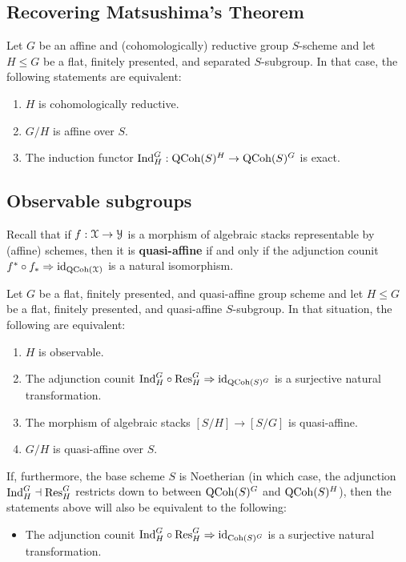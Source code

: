     \subsection{Recovering Matsushima's Theorem}
        \begin{proposition}
            Let $G$ be an affine and (cohomologically) reductive group $S$-scheme and let $H \leq G$ be a flat, finitely presented, and separated $S$-subgroup. In that case, the following statements are equivalent:
            \begin{enumerate}
                \item $H$ is cohomologically reductive.
                \item $G/H$ is affine over $S$.
                \item The induction functor $\mathrm{Ind}_H^G: \mathrm{QCoh}(S)^H \to \mathrm{QCoh}(S)^G$ is exact. 
            \end{enumerate}
        \end{proposition}

    \subsection{Observable subgroups}
        Recall that if $f: \mathcal{X} \to \mathcal{Y}$ is a morphism of algebraic stacks representable by (affine) schemes, then it is \textbf{quasi-affine} if and only if the adjunction counit $f^* \circ f_* \Rightarrow \mathrm{id}_{\mathrm{QCoh}(\mathcal{X})}$ is a natural isomorphism.
    
        \begin{proposition}
            Let $G$ be a flat, finitely presented, and quasi-affine group scheme and let $H \leq G$ be a flat, finitely presented, and quasi-affine $S$-subgroup. In that situation, the following are equivalent:
            \begin{enumerate}
                \item $H$ is observable.
                \item The adjunction counit $\mathrm{Ind}_H^G \circ \mathrm{Res}_H^G \Rightarrow \mathrm{id}_{\mathrm{QCoh}(S)^G}$ is a surjective natural transformation.
                \item The morphism of algebraic stacks $[S/H] \to [S/G]$ is quasi-affine. 
                \item $G/H$ is quasi-affine over $S$.
            \end{enumerate}
            If, furthermore, the base scheme $S$ is Noetherian (in which case, the adjunction $\mathrm{Ind}_H^G \dashv \mathrm{Res}_H^G$ restricts down to between $\mathrm{QCoh}(S)^G$ and $\mathrm{QCoh}(S)^H$), then the statements above will also be equivalent to the following:
            \begin{itemize}
                \item The adjunction counit $\mathrm{Ind}_H^G \circ \mathrm{Res}_H^G \Rightarrow \mathrm{id}_{\mathrm{Coh}(S)^G}$ is a surjective natural transformation.
            \end{itemize}
        \end{proposition}

